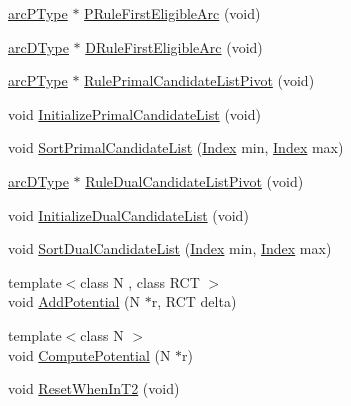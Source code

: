 \begin{DoxyCompactItemize}
\item 
\mbox{\hyperlink{struct_m_c_f_simplex_1_1arc_p_type}{arc\+P\+Type}} $\ast$ \mbox{\hyperlink{class_m_c_f_simplex_ae2b248931e87ec84f096dc4da828e1f2}{P\+Rule\+First\+Eligible\+Arc}} (void)
\item 
\mbox{\hyperlink{struct_m_c_f_simplex_1_1arc_d_type}{arc\+D\+Type}} $\ast$ \mbox{\hyperlink{class_m_c_f_simplex_a1c6a64c292a9f304fd4f951419473695}{D\+Rule\+First\+Eligible\+Arc}} (void)
\item 
\mbox{\hyperlink{struct_m_c_f_simplex_1_1arc_p_type}{arc\+P\+Type}} $\ast$ \mbox{\hyperlink{class_m_c_f_simplex_ab48e077550e17654d21bca709e24f976}{Rule\+Primal\+Candidate\+List\+Pivot}} (void)
\item 
void \mbox{\hyperlink{class_m_c_f_simplex_a24c14a4a1305b97620ee43301a2a7b96}{Initialize\+Primal\+Candidate\+List}} (void)
\item 
void \mbox{\hyperlink{class_m_c_f_simplex_a992f9de53818d841b969210dc1b892cd}{Sort\+Primal\+Candidate\+List}} (\mbox{\hyperlink{class_m_c_f_class_ad53d6229d7ec28555a9c9c2fd9abf773}{Index}} min, \mbox{\hyperlink{class_m_c_f_class_ad53d6229d7ec28555a9c9c2fd9abf773}{Index}} max)
\item 
\mbox{\hyperlink{struct_m_c_f_simplex_1_1arc_d_type}{arc\+D\+Type}} $\ast$ \mbox{\hyperlink{class_m_c_f_simplex_add932371a119910c398ff47376e68b55}{Rule\+Dual\+Candidate\+List\+Pivot}} (void)
\item 
void \mbox{\hyperlink{class_m_c_f_simplex_ac26e76879ac7ff8b94c143fa014d46b5}{Initialize\+Dual\+Candidate\+List}} (void)
\item 
void \mbox{\hyperlink{class_m_c_f_simplex_ab0a21a3677bc14ce294fb95a31b25c23}{Sort\+Dual\+Candidate\+List}} (\mbox{\hyperlink{class_m_c_f_class_ad53d6229d7ec28555a9c9c2fd9abf773}{Index}} min, \mbox{\hyperlink{class_m_c_f_class_ad53d6229d7ec28555a9c9c2fd9abf773}{Index}} max)
\item 
{\footnotesize template$<$class N , class R\+CT $>$ }\\void \mbox{\hyperlink{class_m_c_f_simplex_a16243e09f9d9a9f210996ca607473e30}{Add\+Potential}} (N $\ast$r, R\+CT delta)
\item 
{\footnotesize template$<$class N $>$ }\\void \mbox{\hyperlink{class_m_c_f_simplex_a8207cdb7a51a109c328fc6657262a955}{Compute\+Potential}} (N $\ast$r)
\item 
void \mbox{\hyperlink{class_m_c_f_simplex_a626f2d6f97a01eba10c4fe5a0af5789d}{Reset\+When\+In\+T2}} (void)
\item 

\end{DoxyCompactItemize}

